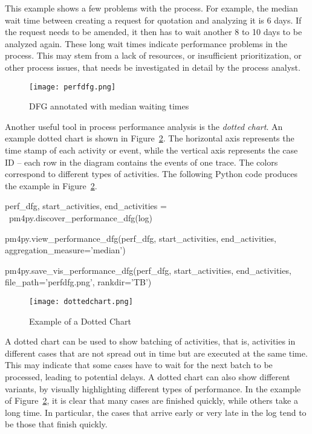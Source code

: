 This example shows a few problems with the process. For example, the median wait time between creating a request for quotation and analyzing it is 6 days. If the request needs to be amended, it then has to wait another 8 to 10 days to be analyzed again. These long wait times indicate performance problems in the process. This may stem from a lack of resources, or insufficient prioritization, or other process issues, that needs be investigated in detail by the process analyst. 

\begin{figure}
\centering

\texttt{[image: perfdfg.png]}
\caption{DFG annotated with median waiting times}
\label{fig:performance_dfg}
\end{figure}

Another useful tool in process performance analysis is the \emph{dotted chart}. An example dotted chart is shown in Figure~\ref{fig:dotted_chart}. The horizontal axis represents the time stamp of each activity or event, while the vertical axis represents the case ID -- each row in the diagram contains the events of one trace. The colors correspond to different types of activities. The following Python code produces the example in Figure~\ref{fig:dotted_chart}.

\begin{pythoncode}
perf_dfg, start_activities, end_activities = \
    pm4py.discover_performance_dfg(log)
    
pm4py.view_performance_dfg(perf_dfg, 
    start_activities, end_activities, 
    aggregation_measure='median')
    
pm4py.save_vis_performance_dfg(perf_dfg, 
    start_activities, end_activities, 
    file_path='perfdfg.png', rankdir='TB')
\end{pythoncode}

\begin{figure}
\centering
\texttt{[image: dottedchart.png]}
\caption{Example of a Dotted Chart}
\label{fig:dotted_chart}
\end{figure}

A dotted chart can be used to show batching of activities, that is, activities in different cases that are not spread out in time but are executed at the same time. This may indicate that some cases have to wait for the next batch to be processed, leading to potential delays. A dotted chart can also show different variants, by visually highlighting different types of performance. In the example of Figure~\ref{fig:dotted_chart}, it is clear that many cases are finished quickly, while others take a long time. In particular, the cases that arrive early or very late in the log tend to be those that finish quickly. 

